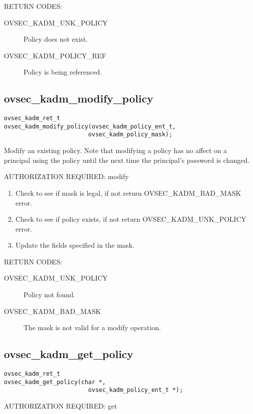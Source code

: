 RETURN CODES:

\begin{description}
\item[OVSEC_KADM_UNK_POLICY] Policy does not exist.
\item[OVSEC_KADM_POLICY_REF] Policy is being referenced. 
\end{description}

\subsection{ovsec_kadm_modify_policy}

\begin{verbatim}
ovsec_kadm_ret_t
ovsec_kadm_modify_policy(ovsec_kadm_policy_ent_t,
                        ovsec_kadm_policy_mask);
\end{verbatim}

Modify an existing policy.  Note that modifying a policy has no affect
on a principal using the policy until the next time the principal's
password is changed.

AUTHORIZATION REQUIRED: modify

\begin{enumerate}
\item Check to see if mask is legal, if not return OVSEC_KADM_BAD_MASK error.
\item Check to see if policy exists, if not return
OVSEC_KADM_UNK_POLICY error.
\item Update the fields specified in the mask.
\end{enumerate}

RETURN CODES: 

\begin{description}
\item[OVSEC_KADM_UNK_POLICY] Policy not found.
\item[OVSEC_KADM_BAD_MASK] The mask is not valid for a modify
operation.
\end{description}

\subsection{ovsec_kadm_get_policy}

\begin{verbatim}
ovsec_kadm_ret_t
ovsec_kadm_get_policy(char *,
                        ovsec_kadm_policy_ent_t *); 
\end{verbatim}

AUTHORIZATION REQUIRED: get

